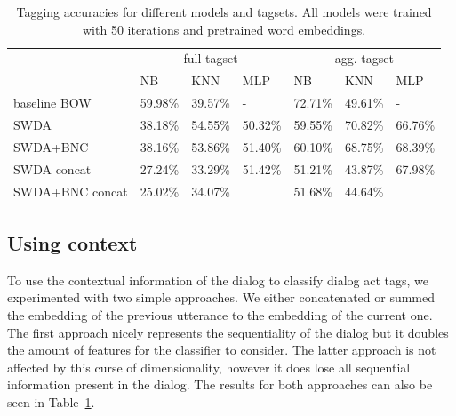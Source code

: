 \begin{table}[]
\centering
\begin{tabular}{llll|lll}
                   & \multicolumn{3}{c|}{full tagset} & \multicolumn{3}{c}{agg. tagset} \\
                   & NB      & KNN     & MLP     & NB     & KNN     & MLP     \\
\hline
baseline BOW      & 59.98\%  & 39.57\% & -       & 72.71\%& 49.61\% &  -         \\
SWDA               & 38.18\%        & 54.55\%        &  50.32\%       &  59.55\%      &  70.82\%       &  66.76\%       \\
SWDA+BNC         & 38.16\%        &  53.86\%       &  51.40\%       &  60.10\%      &  68.75\%       &  68.39\%       \\
SWDA concat      & 27.24\%        & 33.29\%        &  51.42\%       & 51.21\%       &  43.87\%       &  67.98\%       \\
SWDA+BNC concat  & 25.02\%        & 34.07\%        &                & 51.68\%       & 44.64\%        &                 \\
\end{tabular}
\caption{Tagging accuracies for different models and tagsets. All models were trained with 50 iterations and pretrained word embeddings.}
\label{tab:results}
\end{table}


\subsection{Using context}
To use the contextual information of the dialog to classify dialog act tags, we experimented with two simple approaches. We either concatenated or summed the embedding of the previous utterance to the embedding of the current one.
The first approach nicely represents the sequentiality of the dialog but it doubles the amount of features for the classifier to consider.
The latter approach is not affected by this curse of dimensionality, however it does lose all sequential information present in the dialog.
The results for both approaches can also be seen in Table~\ref{tab:results}.

